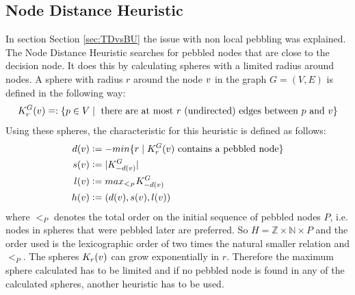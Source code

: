 \documentclass{llncs}
\newcommand{\defeq}{\mathrel{\mathop:}=}
\newcommand{\eqdef}{\mathrel{\mathop=}:}
\begin{document}
\subsection{Node Distance Heuristic}
\label{sec:distance}
In section Section \ref{sec:TDvsBU} the issue with non local pebbling was explained.
The Node Distance Heuristic searches for pebbled nodes that are close to the decision node.
It does this by calculating spheres with a limited radius around nodes.
A sphere with radius $r$ around the node $v$ in the graph $G = (V,E)$ is defined in the following way: 
$$K_r^{G}(\n) \eqdef \{p \in V \mid \text{ there are at most } r \text{ (undirected) edges between } p \text{ and } \n\}$$
Using these spheres, the characteristic for this heuristic is defined as follows:
\begin{align*}
d(\n) &\defeq -min\{r \mid K_r^{G}(\n)\text{ contains a pebbled node}\}\\
	s(\n) &\defeq |K_{-d(\n)}^G|\\
	l(\n) &\defeq max_{<_P}K_{-d(\n)}^G\\
	h(\n) &\defeq (d(\n),s(\n),l(\n))
\end{align*}
where $<_P$ denotes the total order on the initial sequence of pebbled nodes $P$, i.e. nodes in spheres that were pebbled later are preferred.
So $H = \mathbb{Z} \times \mathbb{N} \times P$ and the order used is the lexicographic order of two times the natural smaller relation and $<_P$.
The spheres $K_r(v)$ can grow exponentially in $r$. Therefore the maximum sphere calculated has to be limited and if no pebbled node is found in any of the calculated spheres, another heuristic has to be used.
\end{document}

